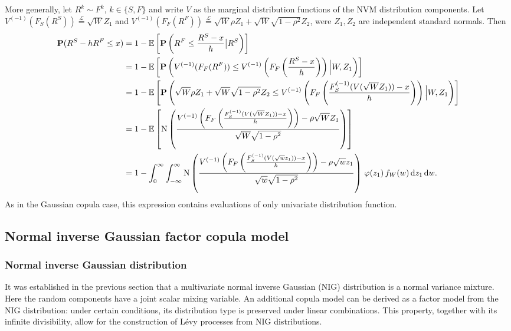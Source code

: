 More generally, let $R^k\sim F^k$, $k\in \{S,F\}$ and write $V$
as the marginal distribution functions of the NVM distribution
components. Let $V^{(-1)}(F_S(R^S)) \stackrel{\mathcal L}{=} \sqrt{W}
Z_1$ and $V^{(-1)}(F_F(R^F)) \stackrel{\mathcal L}{=} 
\sqrt{W} \rho Z_1 + \sqrt{W} \sqrt{1-\rho^2} Z_2$, were $Z_1, Z_2$ are
independent standard normals. Then 
\begin{align*}
  \p(R^S-h R^F\leq x)
  &= 1-\E\left[ \p\left(R^F\leq \frac{R^S-x}{h}\big| R^S\right)\right] \\ %
  &= 1-\E\left[\p \left(V^{(-1)}(F_F(R^F)) \leq
    V^{(-1)}\left(F_F\left(\frac{R^S-x}{h}\right)\right) \Big|
    W, Z_1\right)\right] \\%
  &= 1-\E\left[ \p\left(\sqrt{W} \rho Z_1 + \sqrt{W} \sqrt{1-\rho^2}
    Z_2\leq V^{(-1)}\left(F_F\left(\frac{F_S^{(-1)}(V(\sqrt{W}
    Z_1))-x}{h}\right)\right) \Big| W, Z_1\right)\right]\\ %
  &= 1-\E\left[ \Ncdf \left(
    \frac{V^{(-1)}\left(F_F\left(\frac{F_S^{(-1)}(V(\sqrt{W}
    Z_1))-x}{h}\right)\right) -\rho \sqrt{W} Z_1} {
    \sqrt{W}\sqrt{1-\rho^2}}\right)\right]\\ 
  &= 1-\int_0^\infty \int_{-\infty}^{\infty} \Ncdf \left(
    \frac{V^{(-1)}\left(F_F\left(\frac{F_S^{(-1)}(V(\sqrt{w}
    z_1))-x}{h}\right)\right) -\rho\sqrt{w} z_1} { \sqrt{w}
    \sqrt{1-\rho^2}}\right) \, \varphi(z_1)\, f_W(w)\, \dd z_1\, \dd
    w.%
\end{align*}
As in the Gaussian copula case, this expression contains evaluations
of only univariate distribution function. 


\subsection{Normal inverse Gaussian factor copula model}
\label{sec:norm-inverse-gauss-1}

\subsubsection{Normal inverse Gaussian distribution}
\label{sec:norm-inverse-gauss-2}


It was established in the previous section that a multivariate normal
inverse Gaussian (NIG)
distribution is a normal variance mixture. Here the random components 
have a joint scalar mixing variable. 
An additional copula model can be derived as a factor model from the
NIG distribution: under certain conditions, its distribution type is
preserved under linear combinations. This property, together with 
its infinite divisibility, allow for the construction of L\'evy
processes from NIG distributions. 

